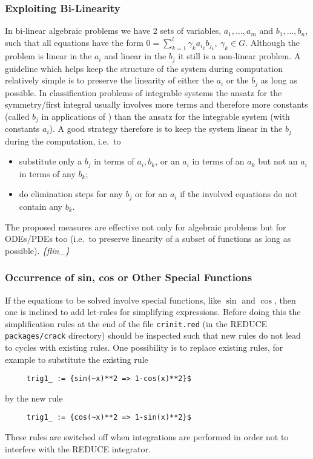 \subsubsection{Exploiting Bi-Linearity}

In bi-linear algebraic problems we have 2 sets of variables,
$a_1,\ldots,a_m$ and $b_1,\ldots,b_n$, such that all equations have
the form $0=\sum_{k=1}^l \gamma_k a_{i_k}b_{j_k}, \ \gamma_k \in G$.
Although the problem is linear in the $a_i$ and linear in the $b_j$ it
still is a non-linear problem.  A guideline which helps keep the
structure of the system during computation relatively simple is to
preserve the linearity of either the $a_i$ or the $b_j$ as long as
possible.  In classification problems of integrable systems the ansatz
for the symmetry/first integral usually involves more terms and
therefore more constants (called $b_j$ in applications of
) than the ansatz for the integrable system (with
constants $a_i$).  A good strategy therefore is to keep the system
linear in the $b_j$ during the computation, i.e.\ to
\begin{itemize}
\item substitute only a $b_j$ in terms of $a_i, b_k$, or an $a_i$ in
  terms of an $a_k$ but not an $a_i$ in terms of any $b_k$;
\item do elimination steps for any $b_j$ or for an $a_i$ if the
  involved equations do not contain any $b_k$.
\end{itemize}
The proposed measures are effective not only for algebraic problems
but for ODEs/PDEs too (i.e.\ to preserve linearity of a subset of
functions as long as possible).  \emph{\{flin\_\}}

\subsubsection{Occurrence of sin, cos or Other Special Functions}

If the equations to be solved involve special functions, like $\sin$
and $\cos$, then one is inclined to add let-rules for simplifying
expressions.  Before doing this the simplification rules at the end of
the file \texttt{crinit.red} (in the REDUCE \texttt{packages/crack}
directory) should be inspected such that new rules do not lead to
cycles with existing rules.  One possibility is to replace existing
rules, for example to substitute the existing rule
\begin{verbatim}
     trig1_ := {sin(~x)**2 => 1-cos(x)**2}$
\end{verbatim}
by the new rule
\begin{verbatim}
     trig1_ := {cos(~x)**2 => 1-sin(x)**2}$
\end{verbatim}
These rules are switched off when integrations are performed in order
not to interfere with the REDUCE integrator.

